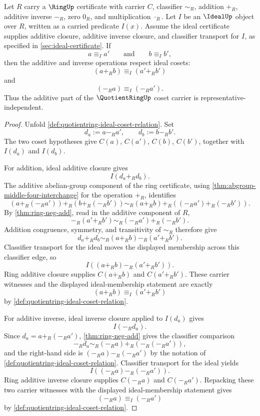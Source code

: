 \begin{theorem}
\label{thm:quotientring-additive-descent}
Let $R$ carry a $\RingUp$ certificate with carrier $C$, classifier $\sim_R$, addition $+_R$, additive inverse $-_R$, zero $0_R$, and multiplication $\cdot_R$. Let $I$ be an $\IdealUp$ object over $R$, written as a carried predicate $I(x)$. Assume the ideal certificate supplies additive closure, additive inverse closure, and classifier transport for $I$, as specified in \autoref{sec:ideal-certificate}. If
$$
a\equiv_I a' \qquad \text{and} \qquad b\equiv_I b',
$$
then the additive and inverse operations respect ideal cosets:
$$
(a+_R b)\equiv_I(a'+_R b')
$$
and
$$
(-_R a)\equiv_I(-_R a').
$$
Thus the additive part of the $\QuotientRingUp$ coset carrier is representative-independent.
\end{theorem}
\begin{proof}
Unfold \autoref{def:quotientring-ideal-coset-relation}. Set
$$
d_a:=a-_R a', \qquad d_b:=b-_R b'.
$$
The two coset hypotheses give $C(a)$, $C(a')$, $C(b)$, $C(b')$, together with $I(d_a)$ and $I(d_b)$.

For addition, ideal additive closure gives
$$
I(d_a+_R d_b).
$$
The additive abelian-group component of the ring certificate, using \autoref{thm:abgroup-middle-four-interchange} for the operation $+_R$, identifies
$$
(a+_R(-_R a'))+_R(b+_R(-_R b'))
\sim_R
(a+_R b)+_R((-_R a')+_R(-_R b')).
$$
By \autoref{thm:ring-neg-add}, read in the additive component of $R$,
$$
-_R(a'+_R b')\sim_R(-_R a')+_R(-_R b').
$$
Addition congruence, symmetry, and transitivity of $\sim_R$ therefore give
$$
d_a+_R d_b\sim_R(a+_R b)-_R(a'+_R b').
$$
Classifier transport for the ideal moves the displayed membership across this classifier edge, so
$$
I((a+_R b)-_R(a'+_R b')).
$$
Ring additive closure supplies $C(a+_R b)$ and $C(a'+_R b')$. These carrier witnesses and the displayed ideal-membership statement are exactly
$$
(a+_R b)\equiv_I(a'+_R b')
$$
by \autoref{def:quotientring-ideal-coset-relation}.

For additive inverse, ideal inverse closure applied to $I(d_a)$ gives
$$
I(-_R d_a).
$$
Since $d_a=a+_R(-_R a')$, \autoref{thm:ring-neg-add} gives the classifier comparison
$$
-_R d_a\sim_R(-_R a)+_R(-_R(-_R a')),
$$
and the right-hand side is $(-_R a)-_R(-_R a')$ by the notation of \autoref{def:quotientring-ideal-coset-relation}. Classifier transport for the ideal yields
$$
I((-_R a)-_R(-_R a')).
$$
Ring additive inverse closure supplies $C(-_R a)$ and $C(-_R a')$. Repacking these two carrier witnesses with the displayed ideal-membership statement gives
$$
(-_R a)\equiv_I(-_R a')
$$
by \autoref{def:quotientring-ideal-coset-relation}.
\end{proof}

